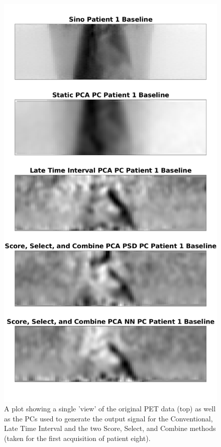             \begin{figure}
                \centering
                
                \includegraphics[width=0.7\linewidth]{figures/data_driven_surrogate_signal_extraction_methods_1_patient_one_pc_output.png}
                
                \captionsetup{singlelinecheck=false}
                \caption{
                    A plot showing a single 'view' of the original PET data (top) as well as the \glspl{PC} used to generate the output signal for the Conventional, Late Time Interval and the two Score, Select, and Combine methods (taken for the first acquisition of patient eight).
                }
                \label{fig:patient_one_pc_output}
            \end{figure}
            
